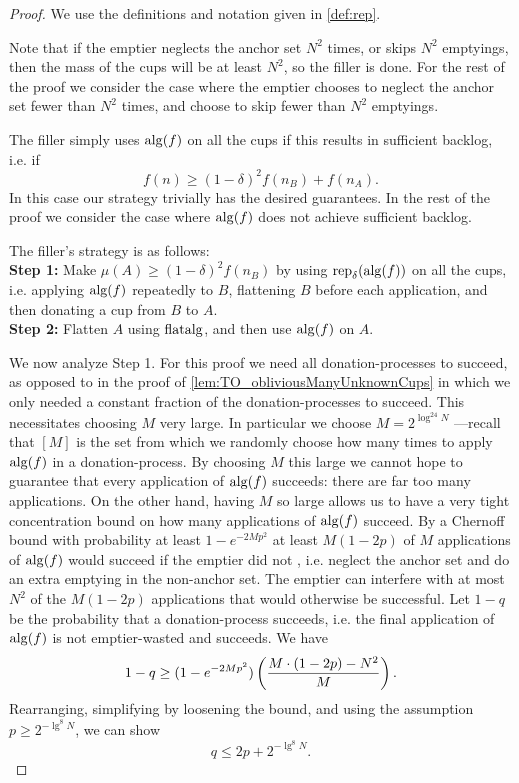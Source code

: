 \begin{proof}
  We use the definitions and notation given in \cref{def:rep}. 

  Note that if the emptier neglects the anchor set $N^2$ times,
  or skips $N^2$ emptyings, then the mass of the cups will be at
  least $N^2$, so the filler is done. For the rest of the proof
  we consider the case where the emptier chooses to neglect
  the anchor set fewer than $N^2$ times, and choose to skip fewer
  than $N^2$ emptyings.

  The filler simply uses $\operatorname{\text{\textup{alg}}}(f)$ on all the cups if this
  results in sufficient backlog, i.e. if
  $$f(n) \ge (1-\delta)^2 f(n_B) + f(n_A).$$
  In this case our strategy trivially has the desired guarantees. 
  In the rest of the proof we consider the case where $\operatorname{\text{\textup{alg}}}(f)$
  does not achieve sufficient backlog.

  The filler's strategy is as follows:\\
  \textbf{Step 1:} Make $\mu(A) \ge (1-\delta)^2 f(n_B)$ by
  using $\operatorname{\text{\textup{rep}}}_\delta(\operatorname{\text{\textup{alg}}}(f))$ on all the cups,
  i.e. applying $\operatorname{\text{\textup{alg}}}(f)$ repeatedly to $B$, flattening $B$ before
  each application, and then donating a cup from $B$ to $A$.\\
  \textbf{Step 2:} Flatten $A$ using $\operatorname{\text{\textup{flatalg}}}$, and then use
  $\operatorname{\text{\textup{alg}}}(f)$ on $A$.

  We now analyze Step 1.
  For this proof we need all donation-processes to succeed, as
  opposed to in the proof of
  \cref{lem:TO_obliviousManyUnknownCups} in which we only needed
  a constant fraction of the donation-processes to succeed. This
  necessitates choosing $M$ very large. In particular we choose
  $M = 2^{\log^{24} N}$ ---recall that $[M]$ is the set from
  which we randomly choose how many times to apply $\operatorname{\text{\textup{alg}}}(f)$ in a
  donation-process. By choosing $M$ this large we cannot hope to
  guarantee that every application of $\operatorname{\text{\textup{alg}}}(f)$ succeeds: there
  are far too many applications. On the other hand, having $M$ so
  large allows us to have a very tight concentration bound on how
  many applications of $\operatorname{\text{\textup{alg}}}(f)$ succeed. By a Chernoff bound
  with probability at least $1-e^{-2Mp^2}$ at least $M(1-2p)$ of
  $M$ applications of $\operatorname{\text{\textup{alg}}}(f)$ would succeed if the emptier did
  not , i.e. neglect the anchor set and do an
  extra emptying in the non-anchor set. The emptier can interfere
  with at most $N^2$ of the $M(1-2p)$ applications that would
  otherwise be successful. Let $1-q$ be the probability that a
  donation-process succeeds, i.e. the final application of
  $\operatorname{\text{\textup{alg}}}(f)$ is not emptier-wasted and succeeds. We have $$1-q \ge
  (1-e^{-2Mp^2})\left( \frac{M\cdot (1-2p)-N^2}{M} \right).$$
  Rearranging, simplifying by loosening the bound, and using the
  assumption $p \ge 2^{-\lg^8 N}$, we can show $$q \le 2p +
  2^{-\lg^8 N}.$$


\end{proof}
